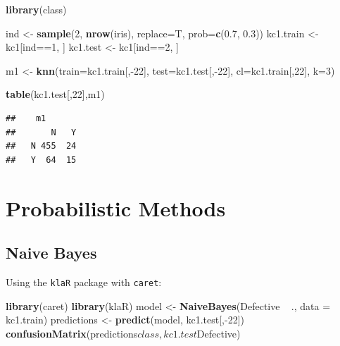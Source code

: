 \documentclass[]{book}
\newenvironment{Shaded}{\begin{snugshade}}{\end{snugshade}}
\newcommand{\KeywordTok}[1]{\textcolor[rgb]{0.13,0.29,0.53}{\textbf{{#1}}}}
\newcommand{\DataTypeTok}[1]{\textcolor[rgb]{0.13,0.29,0.53}{{#1}}}
\newcommand{\DecValTok}[1]{\textcolor[rgb]{0.00,0.00,0.81}{{#1}}}
\newcommand{\FloatTok}[1]{\textcolor[rgb]{0.00,0.00,0.81}{{#1}}}
\newcommand{\StringTok}[1]{\textcolor[rgb]{0.31,0.60,0.02}{{#1}}}
\newcommand{\NormalTok}[1]{{#1}}
\begin{document}
\begin{Shaded}
\begin{Highlighting}[]
\KeywordTok{library}\NormalTok{(class)}

\NormalTok{ind <-}\StringTok{ }\KeywordTok{sample}\NormalTok{(}\DecValTok{2}\NormalTok{, }\KeywordTok{nrow}\NormalTok{(iris), }\DataTypeTok{replace=}\NormalTok{T, }\DataTypeTok{prob=}\KeywordTok{c}\NormalTok{(}\FloatTok{0.7}\NormalTok{, }\FloatTok{0.3}\NormalTok{))}
\NormalTok{kc1.train <-}\StringTok{ }\NormalTok{kc1[ind==}\DecValTok{1}\NormalTok{, ]}
\NormalTok{kc1.test <-}\StringTok{ }\NormalTok{kc1[ind==}\DecValTok{2}\NormalTok{, ]}

\NormalTok{m1 <-}\StringTok{ }\KeywordTok{knn}\NormalTok{(}\DataTypeTok{train=}\NormalTok{kc1.train[,-}\DecValTok{22}\NormalTok{], }\DataTypeTok{test=}\NormalTok{kc1.test[,-}\DecValTok{22}\NormalTok{], }\DataTypeTok{cl=}\NormalTok{kc1.train[,}\DecValTok{22}\NormalTok{], }\DataTypeTok{k=}\DecValTok{3}\NormalTok{)}

\KeywordTok{table}\NormalTok{(kc1.test[,}\DecValTok{22}\NormalTok{],m1)}
\end{Highlighting}
\end{Shaded}

\begin{verbatim}
##    m1
##       N   Y
##   N 455  24
##   Y  64  15
\end{verbatim}

\section{Probabilistic Methods}\label{probabilistic-methods}

\subsection{Naive Bayes}\label{naive-bayes}

Using the \texttt{klaR} package with \texttt{caret}:

\begin{Shaded}
\begin{Highlighting}[]
\KeywordTok{library}\NormalTok{(caret)}
\KeywordTok{library}\NormalTok{(klaR)}
\NormalTok{model <-}\StringTok{ }\KeywordTok{NaiveBayes}\NormalTok{(Defective ~}\StringTok{ }\NormalTok{., }\DataTypeTok{data =} \NormalTok{kc1.train)}
\NormalTok{predictions <-}\StringTok{ }\KeywordTok{predict}\NormalTok{(model, kc1.test[,-}\DecValTok{22}\NormalTok{])}
\KeywordTok{confusionMatrix}\NormalTok{(predictions$class, kc1.test$Defective)}
\end{Highlighting}
\end{Shaded}
\end{document}
